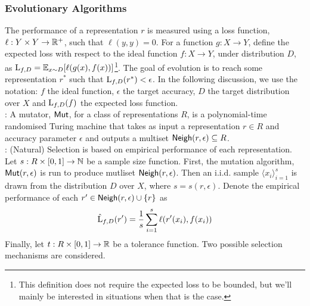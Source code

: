 \subsubsection*{Evolutionary Algorithms}

The performance of a representation $r$ is measured using a loss function, $\ell
: Y \times Y \rightarrow \mathbb{R}^+$, such that $\ell(y, y) = 0$. For a function
$g : X \rightarrow Y$, define the expected loss with respect to the ideal
function $f : X \rightarrow Y$, under distribution $D$, as $\mathrm{L}_{f, D} = \mathbb{E}_{x
\sim D}[\ell(g(x), f(x))]$\footnote{This definition does not require the
expected loss to be bounded, but we'll mainly be interested in situations when
that is the case.}. The goal of evolution is to reach some representation $r^*$
such that $\mathrm{L}_{f, D}(r^*) < \epsilon$. In the following discussion, we use
the notation: $f$ the ideal function, $\epsilon$ the target accuracy, $D$ the
target distribution over $X$ and $\mathrm{L}_{f, D}(f)$ the expected loss function.  \medskip \\
%
: A mutator, $\mathsf{Mut}$, for a class of representations $R$,
is a polynomial-time randomised Turing machine that takes as input a
representation $r \in R$ and accuracy parameter $\epsilon$ and outputs a
multiset $\mathsf{Neigh}(r, \epsilon) \subseteq R$. \medskip \\
%
: (Natural) Selection is based on empirical performance
of each representation. Let $s : R \times [0, 1] \rightarrow \mathbb{N}$ be a
sample size function. First, the mutation algorithm, $\mathsf{Mut}(r, \epsilon)$ is run
to produce mutliset $\mathsf{Neigh}(r, \epsilon)$. Then an i.i.d. sample $\langle x_i
\rangle_{i=1}^s$ is drawn from the distribution $D$ over $X$, where $s = s(r,
\epsilon)$.  Denote the empirical performance of each $r^\prime \in \mathsf{Neigh}(r,
\epsilon) \cup \{r \}$ as
%
\[ \hat{\mathrm{L}}_{f, D}(r^\prime) = \frac{1}{s}\sum_{i=1}^s \ell(r^\prime(x_i),
f(x_i)) \]
%
Finally, let $t : R \times [0, 1] \rightarrow \mathbb{R}$ be a tolerance function.
Two possible selection mechanisms are considered.
